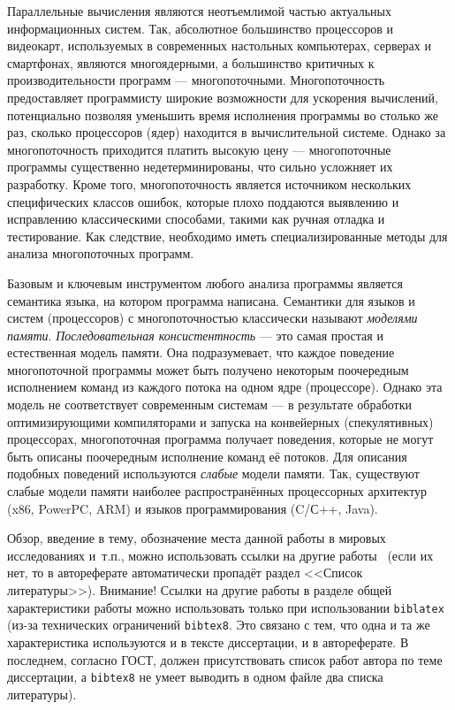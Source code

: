 
{\actuality} Параллельные вычисления являются неотъемлимой частью актуальных
информационных систем. Так, абсолютное большинство процессоров и видеокарт, используемых
в современных настольных компьютерах, серверах и смартфонах, являются многоядерными,
а большинство критичных к производительности программ --- многопоточными.
Многопоточность предоставляет программисту широкие возможности для ускорения вычислений,
потенциально позволяя уменьшить время исполнения программы во столько же раз, сколько
процессоров (ядер) находится в вычислительной системе. Однако за многопоточность приходится
платить высокую цену --- многопоточные программы существенно недетерминированы, что сильно
усложняет их разработку. Кроме того, многопоточность является источником нескольких
специфических классов ошибок, которые плохо поддаются выявлению и исправлению классическими
способами, такими как ручная отладка и тестирование. Как следствие, необходимо иметь
специализированные методы для анализа многопоточных программ.

Базовым и ключевым инструментом любого анализа программы является семантика языка,
на котором программа написана. Семантики для языков и систем (процессоров) с
многопоточностью классически называют \emph{моделями памяти}.
\emph{Последовательная консистентность} --- это самая простая и естественная модель
памяти. Она подразумевает, что каждое поведение многопоточной программы может быть
получено некоторым поочередным исполнением команд из каждого потока на одном ядре
(процессоре). Однако эта модель не соответствует современным системам ---
в результате обработки оптимизирующими компиляторами и запуска на конвейерных
(спекулятивных) процессорах, многопоточная программа получает поведения, которые не могут
быть описаны поочередным исполнение команд её потоков. Для описания подобных поведений
используются \emph{слабые} модели памяти. Так, существуют слабые модели памяти наиболее
распространённых процессорных архитектур (x86, PowerPC, ARM) и языков программирования
(C/С++, Java).

Обзор, введение в тему, обозначение места данной работы в
мировых исследованиях и~т.\:п., можно использовать ссылки на другие
работы~\cite{Gosele1999161} (если их нет, то в автореферате
автоматически пропадёт раздел <<Список литературы>>). Внимание! Ссылки
на другие работы в разделе общей характеристики работы можно
использовать только при использовании \verb!biblatex! (из-за технических
ограничений \verb!bibtex8!. Это связано с тем, что одна и та же
характеристика используются и в тексте диссертации, и в
автореферате. В последнем, согласно ГОСТ, должен присутствовать список
работ автора по теме диссертации, а \verb!bibtex8! не умеет выводить в одном
файле два списка литературы).

